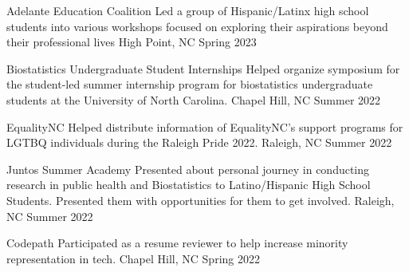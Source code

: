 

\begin{cvhonors}

  \cvhonor
    {Adelante Education Coalition} %
    {Led a group of Hispanic/Latinx high school students into various workshops focused on exploring their aspirations beyond their professional lives} %
    {High Point, NC} %
    {Spring 2023} %
  
  \cvhonor
    {Biostatistics Undergraduate Student Internships} %
    {Helped organize symposium for the student-led summer internship program for biostatistics undergraduate students at the University of North Carolina.} %
    {Chapel Hill, NC} %
    {Summer 2022} %


  \cvhonor
    {EqualityNC} %
    {Helped distribute information of EqualityNC's support programs for LGTBQ individuals during the Raleigh Pride 2022.} %
    {Raleigh, NC} %
    {Summer 2022} %

  \cvhonor
    {Juntos Summer Academy} %
    {Presented about personal journey in conducting research in public health and Biostatistics to Latino/Hispanic High School Students. Presented them with opportunities for them to get involved.} %
    {Raleigh, NC} %
    {Summer 2022} %
    
  \cvhonor
    {Codepath} %
    {Participated as a resume reviewer to help increase minority representation in tech.} %
    {Chapel Hill, NC} %
    {Spring 2022} %

  
  

\end{cvhonors}
